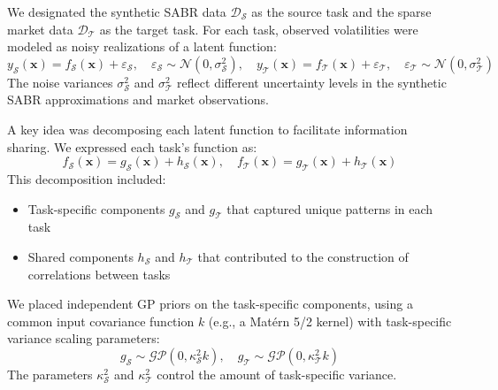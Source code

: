 \documentclass[preprint,12pt]{elsarticle}
\begin{document}
We designated the synthetic SABR data $\mathcal{D}_\mathcal{S}$ as the source task and the sparse market data $\mathcal{D}_\mathcal{T}$ as the target task. For each task, observed volatilities were modeled as noisy realizations of a latent function:
\begin{equation}
    y_\mathcal{S}(\mathbf{x})=f_\mathcal{S}(\mathbf x)+\varepsilon_\mathcal{S}, \quad \varepsilon_\mathcal{S}\sim\mathcal{N}(0,\sigma^2_\mathcal{S}),
    \quad y_\mathcal{T}(\mathbf{x})=f_\mathcal{T}(\mathbf x)+\varepsilon_\mathcal{T}, \quad \varepsilon_\mathcal{T}\sim\mathcal{N}(0,\sigma^2_\mathcal{T})
\end{equation}
The noise variances $ \sigma^2_\mathcal{S} $ and $ \sigma^2_\mathcal{T} $ reflect different uncertainty levels in the synthetic SABR approximations and market observations.

A key idea was decomposing each latent function to facilitate information sharing. We expressed each task's function as:
\begin{equation}
    f_{\mathcal{S}}(\mathbf{x})=g_\mathcal{S}(\mathbf x)+h_{\mathcal S}(\mathbf x),\quad f_{\mathcal{T}}(\mathbf{x})=g_\mathcal{T}(\mathbf x)+h_{\mathcal T}(\mathbf x)
\end{equation}
This decomposition included:
\begin{itemize}
    \item Task-specific components $g_\mathcal{S}$ and $g_\mathcal{T}$ that captured unique patterns in each task
    \item Shared components $h_\mathcal{S}$ and $h_\mathcal{T}$ that contributed to the construction of correlations between tasks
\end{itemize}
We placed independent GP priors on the task-specific components, using a common input covariance function $k$ (e.g., a Matérn 5/2 kernel) with task-specific variance scaling parameters:
\begin{equation}
    g_\mathcal{S}\sim\mathcal{GP}(0,\kappa_{\mathcal S}^2k), \quad g_\mathcal{T}\sim\mathcal{GP}(0,\kappa_{\mathcal T}^2k)
\end{equation}
The parameters $\kappa_{\mathcal S}^2$ and $\kappa_{\mathcal T}^2$ control the amount of task-specific variance.
\end{document}

